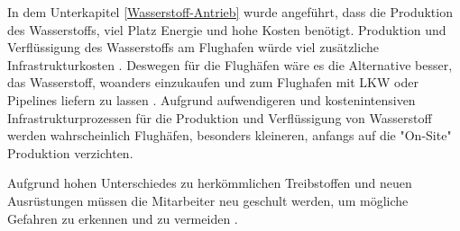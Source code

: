 In dem Unterkapitel \ref{Wasserstoff-Antrieb} wurde angeführt, dass die Produktion des Wasserstoffs, 
viel Platz Energie und hohe Kosten benötigt. Produktion und Verflüssigung des Wasserstoffs am Flughafen würde viel zusätzliche Infrastrukturkosten \cite{dalmia2022powering}.
Deswegen für die Flughäfen wäre es die Alternative besser, das Wasserstoff, woanders einzukaufen und zum Flughafen 
mit LKW oder Pipelines liefern zu lassen \cite{gu2023hydrogen}.
Aufgrund aufwendigeren und kostenintensiven Infrastrukturprozessen für die Produktion und Verflüssigung von 
Wasserstoff werden wahrscheinlich Flughäfen, 
besonders kleineren, anfangs auf die "On-Site" Produktion verzichten.

Aufgrund hohen Unterschiedes zu herkömmlichen Treibstoffen und neuen Ausrüstungen müssen die Mitarbeiter neu geschult werden, 
um mögliche Gefahren zu erkennen und zu vermeiden \cite{gu2023hydrogen}.


